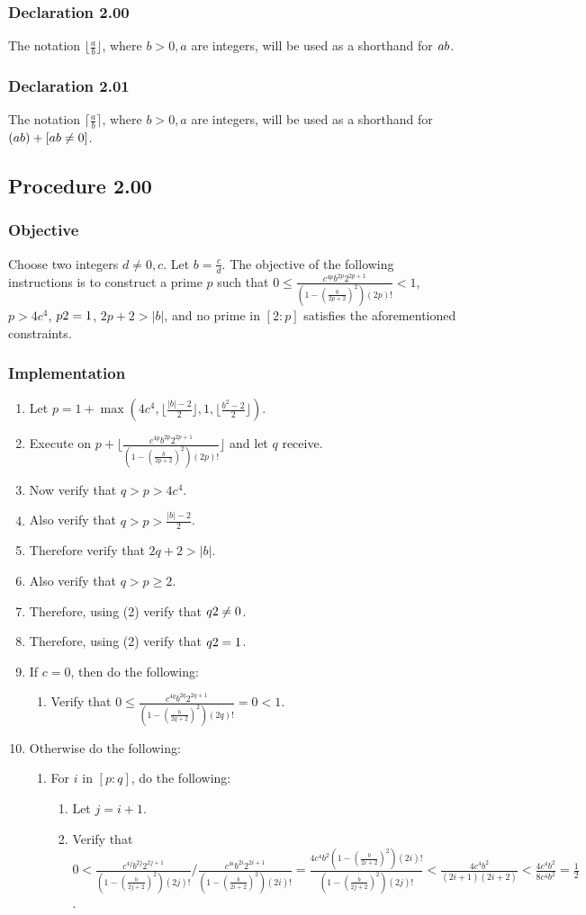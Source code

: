 \documentclass[twocolumn]{article}
\let\div\relax
\DeclareMathOperator{\div}{div}
\let\mod\relax
\DeclareMathOperator{\mod}{mod}
\newcommand{\declaration}[1]{\subsubsection*{Declaration #1}\label{sec:declaration #1}}
\newcommand{\procedure}[2][]{\subsection*{Procedure #2 \ifthenelse{\equal{#1}{}}{}{(#1)}}\label{sec:procedure #2}}
\newcommand{\objective}{\subsubsection*{Objective}}
\newcommand{\implementation}{\subsubsection*{Implementation}}
\newcommand{\procedurehr}[2][]{\hyperref[sec:procedure #2]{\ifthenelse{\equal{#1}{}}{procedure #2}{#1}}}
\begin{document}
		\declaration{2.00}
			The notation $\lfloor\frac{a}{b}\rfloor$, where $b>0,a$ are integers, will be used as a shorthand for $a\div b$.
		\declaration{2.01}
			The notation $\lceil\frac{a}{b}\rceil$, where $b>0,a$ are integers, will be used as a shorthand for $(a\div b)+[a\mod b\ne 0]$.
		\procedure{2.00}
			\objective
				Choose two integers $d\ne 0,c$. Let $b=\frac{c}{d}$. The objective of the following instructions is to construct a prime $p$ such that $0\le\frac{c^{4p}b^{2p}2^{2p+1}}{(1-(\frac{b}{2p+2})^2)(2p)!}<1$, $p>4c^4$, $p\mod 2=1$, $2p+2>\lvert b\rvert$, and no prime in $[2:p]$ satisfies the aforementioned constraints.
			\implementation
				\begin{enumerate}
					\item Let $p=1+\max(4c^4,\lfloor\frac{\lvert b\rvert-2}{2}\rfloor,1,\lfloor\frac{b^2-2}{2}\rfloor)$.
					\item Execute \procedurehr{1.28} on $p+\lfloor\frac{c^{4p}b^{2p}2^{2p+1}}{(1-(\frac{b}{2p+2})^2)(2p)!}\rfloor$ and let $q$ receive.
					\item Now verify that $q>p>4c^4$.
					\item Also verify that $q>p>\frac{\lvert b\rvert-2}{2}$.
					\item Therefore verify that $2q+2>\lvert b\rvert$.
					\item Also verify that $q>p\ge 2$.
					\item Therefore, using (2) verify that $q\mod 2\ne 0$.
					\item Therefore, using (2) verify that $q\mod 2=1$.
					\item If $c=0$, then do the following:
					\begin{enumerate}
						\item Verify that $0\le \frac{c^{4q}b^{2q}2^{2q+1}}{(1-(\frac{b}{2q+2})^2)(2q)!}=0<1$.
					\end{enumerate}
					\item Otherwise do the following:
					\begin{enumerate}
						\item For $i$ in $[p:q]$, do the following:
						\begin{enumerate}
							\item Let $j=i+1$.
							\item Verify that $0<\frac{c^{4j}b^{2j}2^{2j+1}}{(1-(\frac{b}{2j+2})^2)(2j)!}/\frac{c^{4i}b^{2i}2^{2i+1}}{(1-(\frac{b}{2i+2})^2)(2i)!}=\frac{4c^4b^2(1-(\frac{b}{2i+2})^2)(2i)!}{(1-(\frac{b}{2j+2})^2)(2j)!}<\frac{4c^4b^2}{(2i+1)(2i+2)}<\frac{4c^4b^2}{8c^4b^2}=\frac{1}{2}$.

\end{enumerate}
\end{enumerate}
\end{enumerate}
\end{document}
